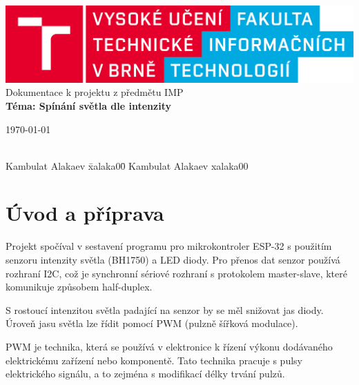 \documentclass[a4paper, 11pt]{article}
\begin{document}
	\begin{titlepage}
		\begin{center}
			\includegraphics[width=0.77\linewidth]{logo_cz.png} \\

			\LARGE{Dokumentace k projektu z předmětu IMP} \\
			\LARGE{\textbf{Téma: Spínání světla dle intenzity}} \\
		\end{center}

		\begin{minipage}{0.4 \textwidth}
			{\Large \today}
		\end{minipage}
		\hfill
		\begin{minipage}[r]{0.6 \textwidth}
			\Large
			  \begin{tabbing}\\ 
                Kambulat Alakaev    \= xalaka00\quad \= \kill
                Kambulat Alakaev    \> xalaka00 \\
    \end{tabbing}
		\end{minipage}
	\end{titlepage}
	
\setcounter{page}{1}
\tableofcontents
\clearpage

\section{Úvod a příprava}
Projekt spočíval v sestavení programu pro mikrokontroler ESP-32 s použitím senzoru intenzity světla (BH1750) a LED diody. Pro přenos dat senzor používá rozhraní I2C, což je synchronní sériové rozhraní s protokolem master-slave, které komunikuje způsobem half-duplex. 

S rostoucí intenzitou světla padající na senzor by se měl snižovat jas diody. Úroveň jasu světla lze řídit pomocí PWM (pulzně šířková modulace). 

PWM je technika, která se používá v elektronice k řízení výkonu dodávaného elektrickému zařízení nebo komponentě. Tato technika pracuje s pulsy elektrického signálu, a to zejména s modifikací délky trvání pulzů.
\end{document}
